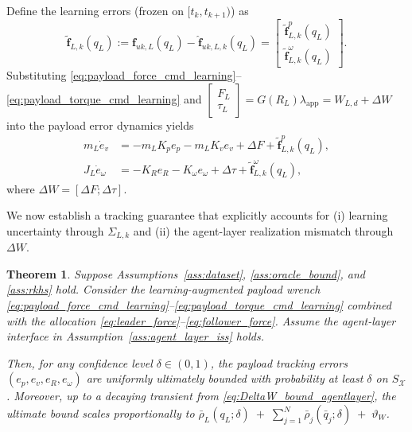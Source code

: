 \documentclass[letterpaper, 10 pt, conference]{ieeeconf}  %
\newcommand{\0}{\matr{0}}
\newtheorem{theorem}{Theorem}
\begin{document}
Define the learning errors (frozen on $[t_k,t_{k+1})$) as
\[
\tilde{\mathbf f}_{L,k}(q_L)
:=
\mathbf f_{uk,L}(q_L)-\hat{\mathbf f}_{uk,L,k}(q_L)
=
\begin{bmatrix}\tilde{\mathbf f}^p_{L,k}(q_L)\\ \tilde{\mathbf f}^\omega_{L,k}(q_L)\end{bmatrix}.
\]
Substituting \eqref{eq:payload_force_cmd_learning}--\eqref{eq:payload_torque_cmd_learning} and
$\begin{bmatrix}F_L\\ \tau_L\end{bmatrix}
=
G(R_L)\lambda_{\mathrm{app}}
=
W_{L,d} + \Delta W$ into the payload error dynamics yields
\begin{align}
m_L\dot e_v
&=
- m_LK_p e_p - m_LK_v e_v
+ \Delta F
+ \tilde{\mathbf f}^{p}_{L,k}(q_L),
\label{eq:err_ev_learning}\\
J_L\dot e_\omega
&=
- K_R e_R - K_\omega e_\omega
+ \Delta \tau
+ \tilde{\mathbf f}^{\omega}_{L,k}(q_L),
\label{eq:err_eomega_learning}
\end{align}
where $\Delta W=[\Delta F;\Delta \tau]$.


We now establish a tracking guarantee that explicitly accounts for (i) learning uncertainty
through $\Sigma_{L,k}$ and (ii) the agent-layer realization mismatch through $\Delta W$.

\begin{theorem}
\label{thm:learning_tracking}
Suppose Assumptions~\ref{ass:dataset}, \ref{ass:oracle_bound}, and \ref{ass:rkhs} hold.
Consider the learning-augmented payload wrench
\eqref{eq:payload_force_cmd_learning}--\eqref{eq:payload_torque_cmd_learning}
combined with the allocation \eqref{eq:leader_force}--\eqref{eq:follower_force}.
Assume the agent-layer interface in Assumption~\ref{ass:agent_layer_iss} holds.

Then, for any confidence level $\delta\in(0,1)$, the payload tracking errors
$(e_p,e_v,e_R,e_\omega)$ are uniformly ultimately bounded with probability at least $\delta$ on $S_{\mathcal X}$. Moreover, up to a decaying transient from \eqref{eq:DeltaW_bound_agentlayer},
the ultimate bound scales proportionally to
$\displaystyle{
\bar\rho_L(q_L;\delta)
\;+\;
\sum_{j=1}^N \bar\rho_j(\bar q_j;\delta)
\;+\;\vartheta_W}$. \end{theorem}
\end{document}
